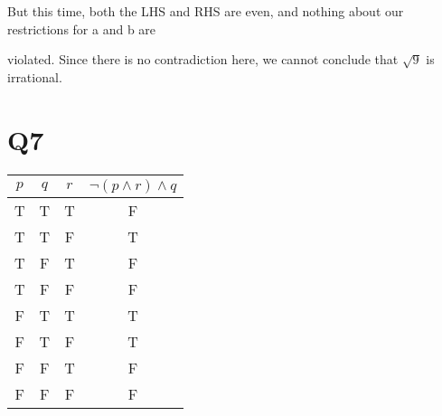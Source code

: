 \documentclass{article}
\begin{document}
But this time, both the LHS and RHS are even, and nothing about our restrictions for a and b are 

violated. Since there is no contradiction here, we cannot conclude that $\sqrt{9}$ is irrational.


 



\section*{Q7}

\begin{table}[h!]
\centering
\begin{tabular}{c c c | c}
$p$ & $q$ & $r$ & $\neg(p \wedge r) \wedge q$ \\
\hline 
T & T & T & F\\ 
T & T & F & T\\
T & F & T & F\\
T & F & F & F\\
F & T & T & T\\
F & T & F & T\\
F & F & T & F\\
F & F & F & F
\end{tabular}
\end{table}



\end{document}
